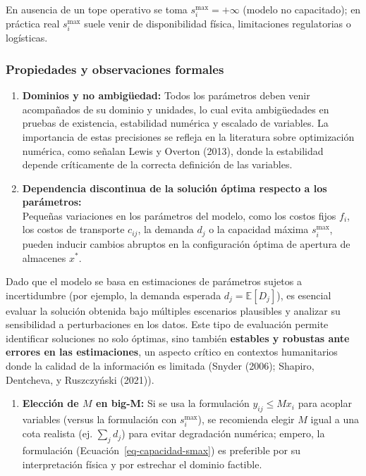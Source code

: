 \documentclass[
  spanish,
  us-letterpaper,
]{scrreprt}
\providecommand{\tightlist}{%
  \setlength{\itemsep}{0pt}\setlength{\parskip}{0pt}}
\numberwithin{equation}{section}
\begin{document}
En ausencia de un tope operativo se toma \(s_i^{\max}=+\infty\) (modelo
no capacitado); en práctica real \(s_i^{\max}\) suele venir de
disponibilidad física, limitaciones regulatorias o logísticas.

\subsubsection{Propiedades y observaciones
formales}\label{propiedades-y-observaciones-formales}

\begin{enumerate}
\def\labelenumi{\arabic{enumi}.}
\item
  \textbf{Dominios y no ambigüedad:} Todos los parámetros deben venir
  acompañados de su dominio y unidades, lo cual evita ambigüedades en
  pruebas de existencia, estabilidad numérica y escalado de variables.
  La importancia de estas precisiones se refleja en la literatura sobre
  optimización numérica, como señalan Lewis y Overton (2013), donde la
  estabilidad depende críticamente de la correcta definición de las
  variables.
\item
  \textbf{Dependencia discontinua de la solución óptima respecto a los
  parámetros:}\\
  Pequeñas variaciones en los parámetros del modelo, como los costos
  fijos \(f_i\), los costos de transporte \(c_{ij}\), la demanda \(d_j\)
  o la capacidad máxima \(s_i^{\max}\), pueden inducir cambios abruptos
  en la configuración óptima de apertura de almacenes \(x^*\).
\end{enumerate}

Dado que el modelo se basa en estimaciones de parámetros sujetos a
incertidumbre (por ejemplo, la demanda esperada
\(d_j = \mathbb{E}[D_j]\)), es esencial evaluar la solución obtenida
bajo múltiples escenarios plausibles y analizar su sensibilidad a
perturbaciones en los datos. Este tipo de evaluación permite identificar
soluciones no solo óptimas, sino también \textbf{estables y robustas
ante errores en las estimaciones}, un aspecto crítico en contextos
humanitarios donde la calidad de la información es limitada (Snyder
(2006); Shapiro, Dentcheva, y Ruszczyński (2021)).

\begin{enumerate}
\def\labelenumi{\arabic{enumi}.}
\setcounter{enumi}{2}
\tightlist
\item
  \textbf{Elección de \(M\) en big-M:} Si se usa la formulación
  \(y_{ij}\le M x_i\) para acoplar variables (versus la formulación con
  \(s_i^{\max}\)), se recomienda elegir \(M\) igual a una cota realista
  (ej. \(\sum_j d_j\)) para evitar degradación numérica; empero, la
  formulación (Ecuación~\ref{eq-capacidad-smax}) es preferible por su
  interpretación física y por estrechar el dominio factible.
\end{enumerate}
\end{document}
